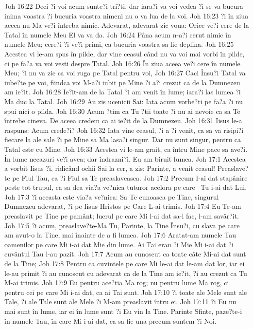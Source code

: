 Joh 16:22  Deci ?i voi acum sunte?i tri?ti, dar iara?i va voi vedea ?i se va bucura inima voastra ?i bucuria voastra nimeni nu o va lua de la voi.
Joh 16:23  ?i în ziua aceea nu Ma ve?i întreba nimic. Adevarat, adevarat zic voua: Orice ve?i cere de la Tatal în numele Meu El va va da.
Joh 16:24  Pâna acum n-a?i cerut nimic în numele Meu; cere?i ?i ve?i primi, ca bucuria voastra sa fie deplina.
Joh 16:25  Acestea vi le-am spus în pilde, dar vine ceasul când nu va voi mai vorbi în pilde, ci pe fa?a va voi vesti despre Tatal.
Joh 16:26  În ziua aceea ve?i cere în numele Meu; ?i nu va zic ca voi ruga pe Tatal pentru voi,
Joh 16:27  Caci Însu?i Tatal va iube?te pe voi, fiindca voi M-a?i iubit pe Mine ?i a?i crezut ca de la Dumnezeu am ie?it.
Joh 16:28  Ie?it-am de la Tatal ?i am venit în lume; iara?i las lumea ?i Ma duc la Tatal.
Joh 16:29  Au zis ucenicii Sai: Iata acum vorbe?ti pe fa?a ?i nu spui nici o pilda.
Joh 16:30  Acum ?tim ca Tu ?tii toate ?i nu ai nevoie ca sa Te întrebe cineva. De aceea credem ca ai ie?it de la Dumnezeu.
Joh 16:31  Iisus le-a raspuns: Acum crede?i?
Joh 16:32  Iata vine ceasul, ?i a ?i venit, ca sa va risipi?i fiecare la ale sale ?i pe Mine sa Ma lasa?i singur. Dar nu sunt singur, pentru ca Tatal este cu Mine.
Joh 16:33  Acestea vi le-am grait, ca întru Mine pace sa ave?i. În lume necazuri ve?i avea; dar îndrazni?i. Eu am biruit lumea.
Joh 17:1  Acestea a vorbit Iisus ?i, ridicând ochii Sai la cer, a zis: Parinte, a venit ceasul! Preaslave?te pe Fiul Tau, ca ?i Fiul sa Te preaslaveasca.
Joh 17:2  Precum I-ai dat stapânire peste tot trupul, ca sa dea via?a ve?nica tuturor acelora pe care  Tu i-ai dat Lui.
Joh 17:3  ?i aceasta este via?a ve?nica: Sa Te cunoasca pe Tine, singurul Dumnezeu adevarat, ?i pe Iisus Hristos pe Care L-ai trimis.
Joh 17:4  Eu Te-am preaslavit pe Tine pe pamânt; lucrul pe care Mi l-ai dat sa-l fac, l-am savâr?it.
Joh 17:5  ?i acum, preaslave?te-Ma Tu, Parinte, la Tine Însu?i, cu slava pe care am avut-o la Tine, mai înainte de a fi lumea.
Joh 17:6  Aratat-am numele Tau oamenilor pe care Mi i-ai dat Mie din lume. Ai Tai erau ?i Mie Mi i-ai dat ?i cuvântul Tau l-au pazit.
Joh 17:7  Acum au cunoscut ca toate câte Mi-ai dat sunt de la Tine;
Joh 17:8  Pentru ca cuvintele pe care Mi le-ai dat le-am dat lor, iar ei le-au primit ?i au cunoscut cu adevarat ca de la Tine am ie?it, ?i au crezut ca Tu M-ai trimis.
Joh 17:9  Eu pentru ace?tia Ma rog; nu pentru lume Ma rog, ci pentru cei pe care Mi i-ai dat, ca ai Tai sunt.
Joh 17:10  ?i toate ale Mele sunt ale Tale, ?i ale Tale sunt ale Mele ?i M-am preaslavit întru ei.
Joh 17:11  ?i Eu nu mai sunt în lume, iar ei în lume sunt ?i Eu vin la Tine. Parinte Sfinte, paze?te-i în numele Tau, în care Mi i-ai dat, ca sa fie una precum suntem ?i Noi.
